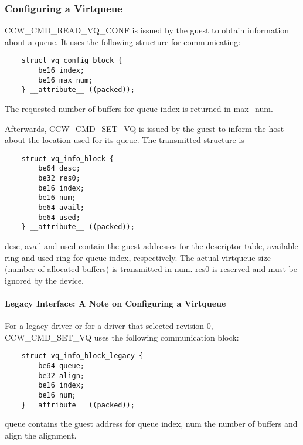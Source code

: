 \subsubsection{Configuring a Virtqueue}\label{sec:Virtio Transport Options / Virtio over channel I/O / Device Initialization / Configuring a Virtqueue}

CCW_CMD_READ_VQ_CONF is issued by the guest to obtain information
about a queue. It uses the following structure for communicating:

\begin{lstlisting}
	struct vq_config_block {
		be16 index;
		be16 max_num;
	} __attribute__ ((packed));
\end{lstlisting}

The requested number of buffers for queue index is returned in
max_num.

Afterwards, CCW_CMD_SET_VQ is issued by the guest to inform the
host about the location used for its queue. The transmitted
structure is

\begin{lstlisting}
	struct vq_info_block {
		be64 desc;
		be32 res0;
		be16 index;
		be16 num;
		be64 avail;
		be64 used;
	} __attribute__ ((packed));
\end{lstlisting}

desc, avail and used contain the guest addresses for the descriptor table,
available ring and used ring for queue index, respectively. The actual
virtqueue size (number of allocated buffers) is transmitted in num.
res0 is reserved and must be ignored by the device.

\paragraph{Legacy Interface: A Note on Configuring a Virtqueue}\label{sec:Virtio Transport Options / Virtio over channel I/O / Device Initialization / Configuring a Virtqueue / Legacy Interface: A Note on Configuring a Virtqueue}

For a legacy driver or for a driver that selected revision 0,
CCW_CMD_SET_VQ uses the following communication block:

\begin{lstlisting}
	struct vq_info_block_legacy {
		be64 queue;
		be32 align;
		be16 index;
		be16 num;
	} __attribute__ ((packed));
\end{lstlisting}

queue contains the guest address for queue index, num the number of buffers
and align the alignment.

